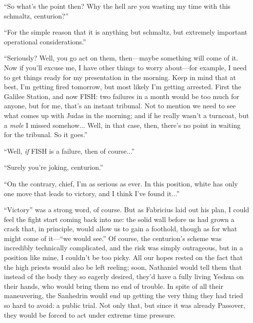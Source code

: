 ``So what's the point then? Why the hell are you wasting my time with this schmaltz, centurion?''

``For the simple reason that it is anything but schmaltz, but extremely important operational considerations.''

``Seriously? Well, you go act on them, then---maybe something will come of it. Now if you'll excuse me, I have other things to worry about---for example, I need to get things ready for my presentation in the morning. Keep in mind that at best, I'm getting fired tomorrow, but most likely I'm getting arrested. First the Galilee Station, and now FISH: two failures in a month would be too much for anyone, but for me, that's an instant tribunal. Not to mention we need to see what comes up with Judas in the morning; and if he really wasn't a turncoat, but a \emph{mole} I missed somehow... Well, in that case, then, there's no point in waiting for the tribunal. So it goes.''

``Well, \emph{if} FISH is a failure, then of course...''

``Surely you're joking, centurion.''

``On the contrary, chief, I'm as serious as ever. In this position, white has only one move that leads to victory, and I think I've found it...''


``Victory'' was a strong word, of course. But as Fabricius laid out his plan, I could feel the fight start coming back into me: the solid wall before us had grown a crack that, in principle, would allow us to gain a foothold, though as for what might come of it---``we would see.'' Of course, the centurion's scheme was incredibly technically complicated, and the risk was simply outrageous, but in a position like mine, I couldn't be too picky. All our hopes rested on the fact that the high priests would also be left reeling; soon, Nathaniel would tell them that instead of the body they so eagerly desired, they'd have a fully living Yeshua on their hands, who would bring them no end of trouble. In spite of all their maneuvering, the Sanhedrin would end up getting the very thing they had tried so hard to avoid: a public trial. Not only that, but since it was already Passover, they would be forced to act under extreme time pressure.

